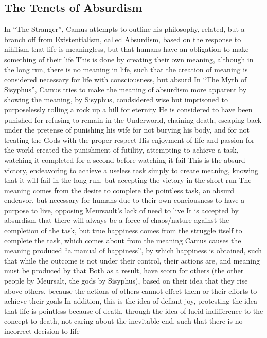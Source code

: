 \documentclass[11 pt, twoside]{article}
\newenvironment{outline*}
{
	\begin{outline}[enumerate]
	}
	{\end{outline}
}
\begin{document}
\subsection{The Tenets of Absurdism}
\begin{outline*}
\1 In ``The Stranger'', Camus attempts to outline his philosophy, related, but a branch off from Existentialism, called Absurdism, based on the response to nihilism that life is meaningless, but that humans have an obligation to make something of their life
\2 This is done by creating their own meaning, although in the long run, there is no meaning in life, such that the creation of meaning is considered necessary for life with consciousness, but absurd
\1 In ``The Myth of Sisyphus'', Camus tries to make the meaning of absurdism more apparent by showing the meaning, by Sisyphus, condsidered wise but imprisoned to purposelessly rolling a rock up a hill for eternity
\2 He is considered to have been punished for refusing to remain in the Underworld, chaining death, escaping back under the pretense of punishing his wife for not burying his body, and for not treating the Gods with the proper respect
\2 His enjoyment of life and passion for the world created the punishment of futility, attempting to achieve a task, watching it completed for a second before watching it fail
\3 This is the absurd victory, endeavoring to achieve a useless task simply to create meaning, knowing that it will fail in the long run, but accepting the victory in the short run
\2 The meaning comes from the desire to complete the pointless task, an absurd endeavor, but necessary for humans due to their own conciousness to have a purpose to live, opposing Meursault's lack of need to live
\3 It is accepted by absurdism that there will always be a force of chaos/nature against the completion of the task, but true happiness comes from the struggle itself to complete the task, which comes about from the meaning
\3 Camus causes the meaning produced ``a manual of happiness'', by which happiness is obtained, such that while the outcome is not under their control, their actions are, and meaning must be produced by that
\3 Both as a result, have scorn for others (the other people by Meursalt, the gods by Sisyphus), based on their idea that they rise above others, because the actions of others cannot effect them or their efforts to achieve their goals
\2 In addition, this is the idea of defiant joy, protesting the idea that life is pointless because of death, through the idea of lucid indifference to the concept to death, not caring about the inevitable end, such that there is no incorrect decision to life

\end{outline*}
\end{document}
